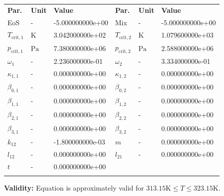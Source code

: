 \begin{longtable}[l]{lll|lll}
\toprule
\addlinespace
\textbf{Par.} & \textbf{Unit} & \textbf{Value} &	\textbf{Par.} & \textbf{Unit} & \textbf{Value} \\
\addlinespace
\midrule
\endhead

\bottomrule
\endfoot
\bottomrule
\endlastfoot
\addlinespace

EoS & - & -5.000000000e+00 & Mix & - & -5.000000000e+00 \\
$T_\mathrm{crit,1}$ & $\si{\kelvin}$ & 3.042000000e+02 & $T_\mathrm{crit,2}$ & $\si{\kelvin}$ & 1.079600000e+03 \\
$p_\mathrm{crit,1}$ & $\si{\pascal}$ & 7.380000000e+06 & $p_\mathrm{crit,2}$ & $\si{\pascal}$ & 2.588000000e+06 \\
$\omega_{1}$ & - & 2.236000000e-01 & $\omega_{2}$ & - & 3.334000000e-01 \\
$\kappa_{1,1}$ & - & 0.000000000e+00 & $\kappa_{1,2}$ & - & 0.000000000e+00 \\
$\beta_{0,1}$ & - & 0.000000000e+00 & $\beta_{0,2}$ & - & 0.000000000e+00 \\
$\beta_{1,1}$ & - & 0.000000000e+00 & $\beta_{1,2}$ & - & 0.000000000e+00 \\
$\beta_{2,1}$ & - & 0.000000000e+00 & $\beta_{2,2}$ & - & 0.000000000e+00 \\
$\beta_{3,1}$ & - & 0.000000000e+00 & $\beta_{3,2}$ & - & 0.000000000e+00 \\
$k_{12}$ & - & -1.800000000e-03 & $m$ & - & 0.000000000e+00 \\
$l_{12}$ & - & 0.000000000e+00 & $l_{21}$ & - & 0.000000000e+00 \\
$t$ & - & 0.000000000e+00 & & & \\

\addlinespace\end{longtable}

\textbf{Validity:}
\newline
Equation is approximately valid for $313.15 \si{\kelvin} \leq T \leq 323.15 \si{\kelvin}$.
\newline

